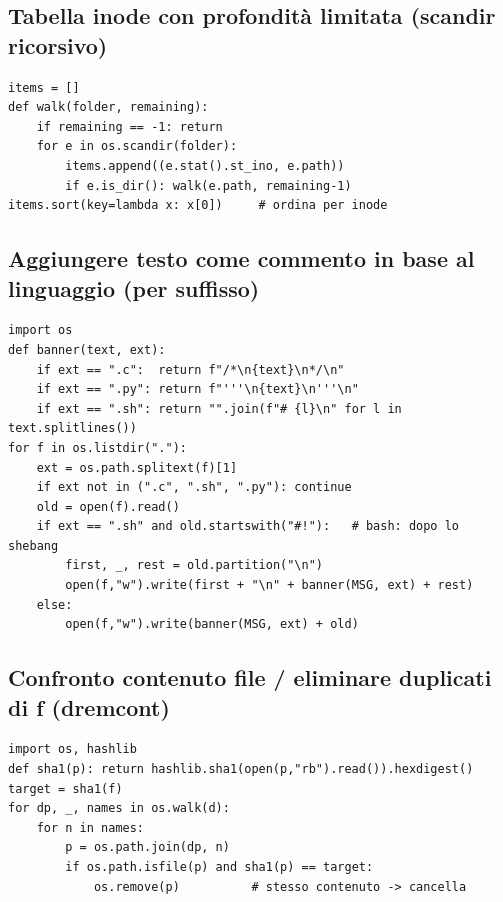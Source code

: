 \documentclass[10pt,a4paper]{article}
\begin{document}
\subsection{Tabella inode con profondità limitata (scandir ricorsivo)}
\begin{lstlisting}[style=py]
items = []
def walk(folder, remaining):
    if remaining == -1: return
    for e in os.scandir(folder):
        items.append((e.stat().st_ino, e.path))
        if e.is_dir(): walk(e.path, remaining-1)
items.sort(key=lambda x: x[0])     # ordina per inode
\end{lstlisting}

\subsection{Aggiungere testo come commento in base al linguaggio (per suffisso)}
\begin{lstlisting}[style=py]
import os
def banner(text, ext):
    if ext == ".c":  return f"/*\n{text}\n*/\n"
    if ext == ".py": return f"'''\n{text}\n'''\n"
    if ext == ".sh": return "".join(f"# {l}\n" for l in text.splitlines())
for f in os.listdir("."):
    ext = os.path.splitext(f)[1]
    if ext not in (".c", ".sh", ".py"): continue
    old = open(f).read()
    if ext == ".sh" and old.startswith("#!"):   # bash: dopo lo shebang
        first, _, rest = old.partition("\n")
        open(f,"w").write(first + "\n" + banner(MSG, ext) + rest)
    else:
        open(f,"w").write(banner(MSG, ext) + old)
\end{lstlisting}

\subsection{Confronto contenuto file / eliminare duplicati di f (dremcont)}
\begin{lstlisting}[style=py]
import os, hashlib
def sha1(p): return hashlib.sha1(open(p,"rb").read()).hexdigest()
target = sha1(f)
for dp, _, names in os.walk(d):
    for n in names:
        p = os.path.join(dp, n)
        if os.path.isfile(p) and sha1(p) == target:
            os.remove(p)          # stesso contenuto -> cancella
\end{lstlisting}

\end{document}
